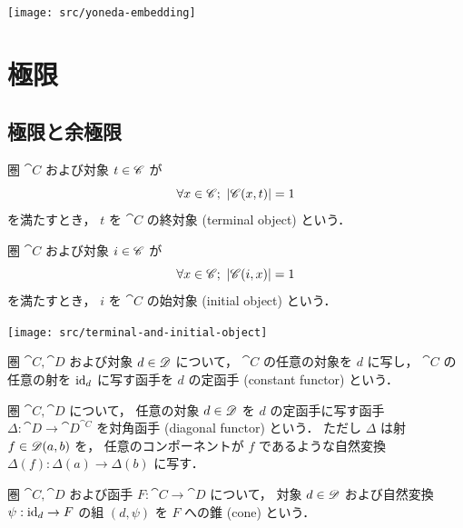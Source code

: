 \documentclass[titlepage]{ltjsreport}
\newtheorem[S]{theorem}{定理}[chapter]
\newtheorem[S]{definition}[theorem]{定義}
\newtheorem[S]{example}[theorem]{例}
\begin{document}
\begin{center}
  \texttt{[image: src/yoneda-embedding]}
\end{center}

\chapter{極限}

\section{極限と余極限}

\begin{definition}[終対象]
  圏 $\cat{C}$ および対象 $t\in\mathscr{C}$ が
  \begin{equation}
    \forall x\in\obj{\cat{C}};\ |\mrp{\cat{C}}{x}{t}|=1
  \end{equation}
  を満たすとき，
  $t$ を $\cat{C}$ の終対象 (terminal object) という．
\end{definition}

\begin{definition}[始対象]
  圏 $\cat{C}$ および対象 $i\in\mathscr{C}$ が
  \begin{equation}
    \forall x\in\obj{\cat{C}};\ |\mrp{\cat{C}}{i}{x}|=1
  \end{equation}
  を満たすとき，
  $i$ を $\cat{C}$ の始対象 (initial object) という．
\end{definition}

\begin{center}
  \texttt{[image: src/terminal-and-initial-object]}
\end{center}

\begin{definition}[定函手]
  圏 $\cat{C},\cat{D}$ および対象 $d\in\mathscr{D}$ について，
  $\cat{C}$ の任意の対象を $d$ に写し，
  $\cat{C}$ の任意の射を $\mathrm{id}_{d}$ に写す函手を $d$ の定函手 (constant functor) という．
\end{definition}

\begin{definition}[対角函手]
  圏 $\cat{C},\cat{D}$ について，
  任意の対象 $d\in\mathscr{D}$ を $d$ の定函手に写す函手
  $\Delta:\cat{D}\to\cat{D}^{\cat{C}}$ を対角函手 (diagonal functor) という．
  ただし $\Delta$ は射 $f\in\mathscr{D}(a,b)$ を，
  任意のコンポーネントが $f$ であるような自然変換
  $\Delta(f):\Delta(a)\to\Delta(b)$ に写す．
\end{definition}

\begin{definition}[錐]
  圏 $\cat{C},\cat{D}$ および函手 $F:\cat{C}\to\cat{D}$ について，
  対象 $d\in\mathscr{D}$ および自然変換 $\psi:\mathrm{id}_{d}\to F$ の組 $(d,\psi)$
  を $F$ への錐 (cone) という．
\end{definition}
\end{document}
